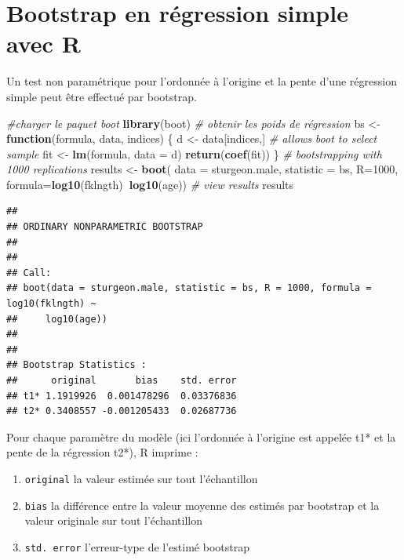 \documentclass[12pt,]{book}
\newenvironment{Shaded}{\begin{snugshade}}{\end{snugshade}}
\newcommand{\CommentTok}[1]{\textcolor[rgb]{0.37,0.37,0.37}{\textit{#1}}}
\newcommand{\ControlFlowTok}[1]{\textcolor[rgb]{0.27,0.27,0.27}{\textbf{#1}}}
\newcommand{\DataTypeTok}[1]{\textcolor[rgb]{0.27,0.27,0.27}{#1}}
\newcommand{\DecValTok}[1]{\textcolor[rgb]{0.06,0.06,0.06}{#1}}
\newcommand{\KeywordTok}[1]{\textcolor[rgb]{0.27,0.27,0.27}{\textbf{#1}}}
\newcommand{\NormalTok}[1]{#1}
\newcommand{\OperatorTok}[1]{\textcolor[rgb]{0.43,0.43,0.43}{\textbf{#1}}}
\newcommand{\StringTok}[1]{\textcolor[rgb]{0.5,0.5,0.5}{#1}}
\providecommand{\tightlist}{%
  \setlength{\itemsep}{0pt}\setlength{\parskip}{0pt}}
\begin{document}
\hypertarget{bootstrap-en-ruxe9gression-simple-avec-r}{%
\section{Bootstrap en régression simple avec R}\label{bootstrap-en-ruxe9gression-simple-avec-r}}

Un test non paramétrique pour l'ordonnée à l'origine et la pente d'une régression simple peut être effectué par bootstrap.

\begin{Shaded}
\begin{Highlighting}[]
\CommentTok{#charger le paquet boot}
\KeywordTok{library}\NormalTok{(boot)}
\CommentTok{# obtenir les poids de régression}
\NormalTok{bs <-}\StringTok{ }\ControlFlowTok{function}\NormalTok{(formula, data, indices) \{}
\NormalTok{  d <-}\StringTok{ }\NormalTok{data[indices,] }\CommentTok{# allows boot to select sample}
\NormalTok{  fit <-}\StringTok{ }\KeywordTok{lm}\NormalTok{(formula, }\DataTypeTok{data =}\NormalTok{ d)}
  \KeywordTok{return}\NormalTok{(}\KeywordTok{coef}\NormalTok{(fit))}
\NormalTok{\}}
\CommentTok{# bootstrapping with 1000 replications}
\NormalTok{results <-}\StringTok{ }\KeywordTok{boot}\NormalTok{(}
  \DataTypeTok{data =}\NormalTok{ sturgeon.male,}
  \DataTypeTok{statistic =}\NormalTok{ bs,}
  \DataTypeTok{R=}\DecValTok{1000}\NormalTok{, }\DataTypeTok{formula=}\KeywordTok{log10}\NormalTok{(fklngth)}\OperatorTok{~}\KeywordTok{log10}\NormalTok{(age))}
\CommentTok{# view results}
\NormalTok{results}
\end{Highlighting}
\end{Shaded}

\begin{verbatim}
## 
## ORDINARY NONPARAMETRIC BOOTSTRAP
## 
## 
## Call:
## boot(data = sturgeon.male, statistic = bs, R = 1000, formula = log10(fklngth) ~ 
##     log10(age))
## 
## 
## Bootstrap Statistics :
##      original       bias    std. error
## t1* 1.1919926  0.001478296  0.03376836
## t2* 0.3408557 -0.001205433  0.02687736
\end{verbatim}

Pour chaque paramètre du modèle (ici l'ordonnée à l'origine est
appelée t1* et la pente de la régression t2*), R imprime :

\begin{enumerate}
\def\labelenumi{\arabic{enumi}.}
\tightlist
\item
  \texttt{original} la valeur estimée sur tout l'échantillon
\item
  \texttt{bias} la différence entre la valeur moyenne des estimés par bootstrap et la valeur originale sur tout l'échantillon
\item
  \texttt{std.\ error} l'erreur-type de l'estimé bootstrap
\end{enumerate}
\end{document}
